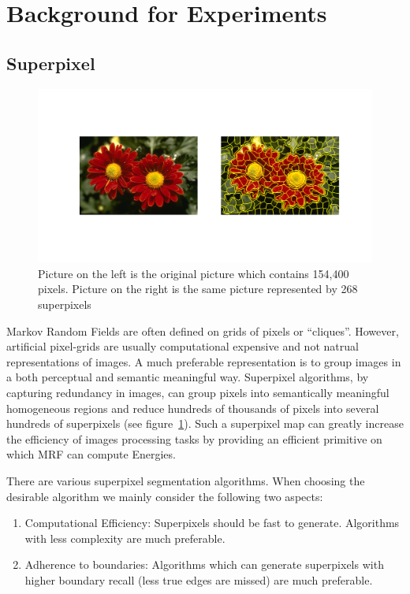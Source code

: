\section{Background for Experiments}

\subsection{Superpixel}
\label{sec:superpixel}

\begin{figure}[t]
  \centering
  \includegraphics[width=1\linewidth]{RelatedWorks/figures/Flower_Origin_Segment.png}
  \caption{\label{fig:superpixel_example} Picture on the left is
    the original picture which contains 154,400 pixels. Picture
    on the right is the same picture represented by 268 superpixels}
\end{figure}

Markov Random Fields are often defined on grids of pixels or
``cliques''. However, artificial pixel-grids are usually
computational expensive and not natrual representations of
images. A much preferable representation is to group images in a
both perceptual and semantic meaningful way. Superpixel
algorithms, by capturing redundancy in images, can group pixels
into semantically meaningful homogeneous regions and reduce
hundreds of thousands of pixels into several hundreds of
superpixels (see figure~\ref{fig:superpixel_example}). Such a superpixel map can greatly increase the
efficiency of images processing tasks by providing an efficient
primitive on which MRF can compute
Energies\cite{achanta2012slic}.

There are various superpixel segmentation algorithms. When
choosing the desirable algorithm we mainly consider the following
two aspects\cite{achanta2012slic}:

\begin{enumerate}
\item Computational Efficiency: Superpixels should be fast to
  generate. Algorithms with less complexity are much preferable.
\item Adherence to boundaries: Algorithms which can generate
  superpixels with higher boundary recall (less true edges are
  missed) are much preferable.
\end{enumerate}

